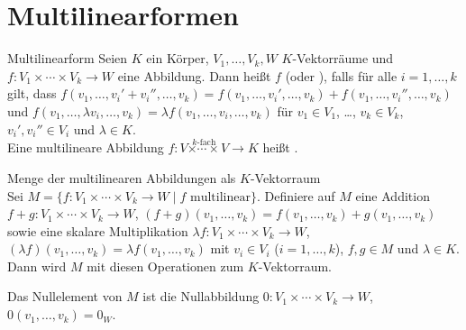 \section{%
    Multilinearformen%
}

\begin{Def}{Multilinearform}
    Seien $K$ ein Körper, $V_1, \dotsc, V_k, W$ $K$-Vektorräume und \\
    $f: V_1 \times \dotsb \times V_k \rightarrow W$ eine Abbildung.
    Dann heißt $f$  (oder ),
    falls für alle $i = 1, \dotsc, k$ gilt, dass
    $f(v_1, \dotsc, v_i' + v_i'', \dotsc, v_k) =
    f(v_1, \dotsc, v_i', \dotsc, v_k) + f(v_1, \dotsc, v_i'', \dotsc, v_k)$
    und $f(v_1, \dotsc, \lambda v_i, \dotsc, v_k) =
    \lambda f(v_1, \dotsc, v_i, \dotsc, v_k)$ für
    $v_1 \in V_1$, \dots, $v_k \in V_k$, $v_i', v_i'' \in V_i$ und
    $\lambda \in K$. \\
    Eine multilineare Abbildung
    $f: V \overset{k\text{-fach}}{\times \dotsb \times} V \rightarrow K$ heißt
    .
\end{Def}

\begin{Satz}{Menge der multilinearen Abbildungen als $K$-Vektorraum} \\
    Sei $M = \{f: V_1 \times \dotsb \times V_k \rightarrow W \;|\;
    f \text{ multilinear}\}$.
    Definiere auf $M$ eine Addition \\
    $f + g: V_1 \times \dotsb \times V_k \rightarrow W$,
    $(f + g)(v_1, \dotsc, v_k) = f(v_1, \dotsc, v_k) + g(v_1, \dotsc, v_k)$
    sowie eine skalare Multiplikation
    $\lambda f: V_1 \times \dotsb \times V_k \rightarrow W$,
    $(\lambda f)(v_1, \dotsc, v_k) = \lambda f(v_1, \dotsc, v_k)$
    mit $v_i \in V_i$ ($i = 1, \dotsc, k$), $f, g \in M$ und $\lambda \in K$.
    Dann wird $M$ mit diesen Operationen zum $K$-Vektorraum.
\end{Satz}

\begin{Bem}
    Das Nullelement von $M$ ist die Nullabbildung
    $0: V_1 \times \dotsb \times V_k \rightarrow W$,
    $0(v_1, \dotsc, v_k) = 0_W$.
\end{Bem}

